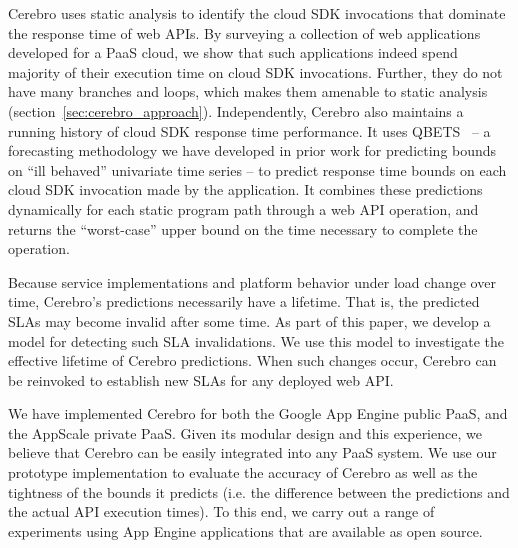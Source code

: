Cerebro uses static analysis to identify the cloud SDK invocations
that dominate the response time of web APIs. By surveying a collection of
web applications developed for a PaaS cloud, we show
that such applications indeed spend majority of their execution time on cloud SDK
invocations. Further, they do not have many branches and loops, which
makes them amenable to static analysis (section~\ref{sec:cerebro_approach}). Independently,
Cerebro also maintains a running history of cloud SDK response time 
performance.  It uses
QBETS~\cite{Nurmi:2007:QQB:1791551.1791556} -- a forecasting methodology
we have developed in prior work for predicting bounds on ``ill behaved''
univariate time series -- to predict response time bounds on each cloud SDK
invocation made by the application.  It combines these predictions dynamically
for each static program path through a web API operation,
and returns the ``worst-case''
upper bound on the time necessary to 
complete the operation.


Because service implementations and platform behavior under load change over time,
Cerebro's predictions necessarily have a lifetime. That is, the predicted SLAs may
become invalid after some time.  
As part of this paper, we develop a model for detecting such SLA invalidations. 
We use this model to investigate
the effective lifetime of Cerebro predictions. When such changes occur,
Cerebro can be reinvoked to establish new SLAs for any deployed web API.  %

We have implemented Cerebro for both the Google App Engine public PaaS, and 
the AppScale private PaaS. Given its modular design and this experience, 
we believe that Cerebro can be easily integrated into any PaaS system.
We use our prototype implementation to evaluate the accuracy of Cerebro 
as well as the tightness
of the bounds it predicts (i.e. the difference between the predictions and 
the actual API execution times). To this end, we carry out a range of experiments
 using App Engine applications that are available as open source.  

